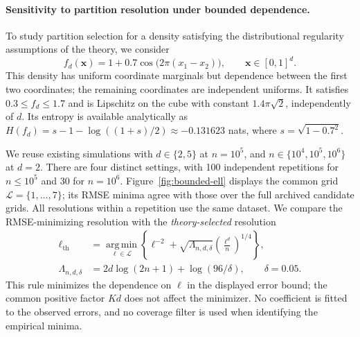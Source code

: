 
\paragraph{Sensitivity to partition resolution under bounded dependence.}
To study partition selection for a density satisfying the distributional
regularity assumptions of the theory, we consider
\begin{equation}
f_d(\mathbf{x})=1+0.7\cos\!\bigl(2\pi(x_1-x_2)\bigr),
\qquad \mathbf{x}\in[0,1]^d.
\label{eq:bounded-dependent-density}
\end{equation}
This density has uniform coordinate marginals but dependence between the
first two coordinates; the remaining coordinates are independent uniforms.
It satisfies $0.3\le f_d\le1.7$ and is Lipschitz on the cube with constant
$1.4\pi\sqrt{2}$, independently of $d$.
Its entropy is available analytically as
$H(f_d)=s-1-\log((1+s)/2)\approx-0.131623$ nats,
where $s=\sqrt{1-0.7^2}$.

We reuse existing simulations with $d\in\{2,5\}$ at $n=10^5$, and
$n\in\{10^4,10^5,10^6\}$ at $d=2$.
There are four distinct settings, with 100 independent repetitions for
$n\le10^5$ and 30 for $n=10^6$.
Figure~\ref{fig:bounded-ell} displays the common grid
$\mathcal{L}=\{1,\ldots,7\}$; its RMSE minima agree with those over the
full archived candidate grids.
All resolutions within a repetition use the same dataset.
We compare the RMSE-minimizing resolution with the \emph{theory-selected}
resolution
\begin{equation}
\begin{aligned}
\ell_{\mathrm{th}}
&=\underset{\ell\in\mathcal{L}}{\operatorname{arg\,min}}
\left\{\ell^{-2}+\sqrt{\Lambda_{n,d,\delta}}
\left(\frac{\ell^d}{n}\right)^{1/4}\right\},\\
\Lambda_{n,d,\delta}
&=2d\log(2n+1)+\log(96/\delta),\qquad\delta=0.05.
\end{aligned}
\label{eq:bounded-theory-ell}
\end{equation}
This rule minimizes the dependence on $\ell$ in the displayed error bound;
the common positive factor $Kd$ does not affect the minimizer.
No coefficient is fitted to the observed errors, and no coverage filter is
used when identifying the empirical minima.

